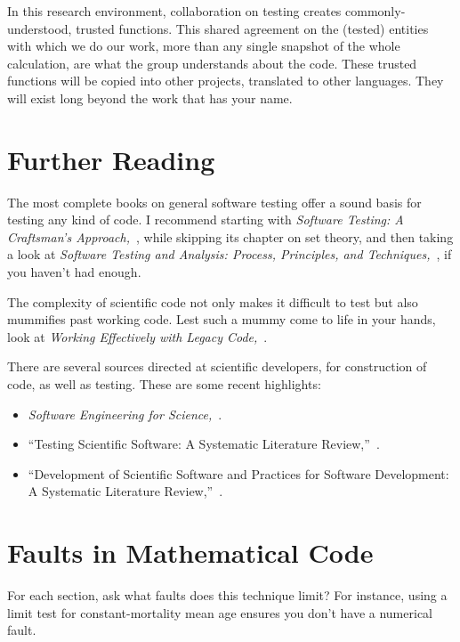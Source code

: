 \documentclass[fleqn,10pt]{olplainarticle}
\begin{document}
In this research environment, collaboration on testing
creates commonly-understood, trusted functions. This shared
agreement on the (tested) entities with which we do our work, more
than any single snapshot of the whole calculation, are
what the group understands about the code. These trusted
functions will be copied into other projects, translated
to other languages. They will exist long beyond the work
that has your name.

\section{Further Reading}\label{sec:further-reading}

The most complete books on general software testing offer a sound
basis for testing any kind of code. I recommend starting with
\emph{Software Testing: A Craftsman's Approach,}~\citep{jorgensen2013},
while skipping its chapter on set theory, and then taking a look at
\emph{Software Testing and Analysis: Process, Principles, and Techniques,}~\citep{pezze2008},
if you haven't had enough.

The complexity of scientific code not only makes it difficult
to test but also mummifies past working code. Lest such a mummy
come to life in your hands, look at \emph{Working Effectively with Legacy Code,}~\citep{feathers2004working}.

There are several sources directed at scientific developers, for
construction of code, as well as testing. These are some recent highlights:
\begin{itemize}
	\item \emph{Software Engineering for Science,}~\cite{carver2017}.
	\item ``Testing Scientific Software: A Systematic Literature Review,''~\cite{kanewala2014}.
	\item ``Development of Scientific Software and Practices for Software Development: A Systematic Literature Review,''~\cite{neumann2016}.
\end{itemize}

\appendix

\section{Faults in Mathematical Code}\label{sec:faults-and-failures}

For each section, ask what faults does this technique limit?
For instance, using a limit test for constant-mortality mean age
ensures you don't have a numerical fault.
\end{document}
